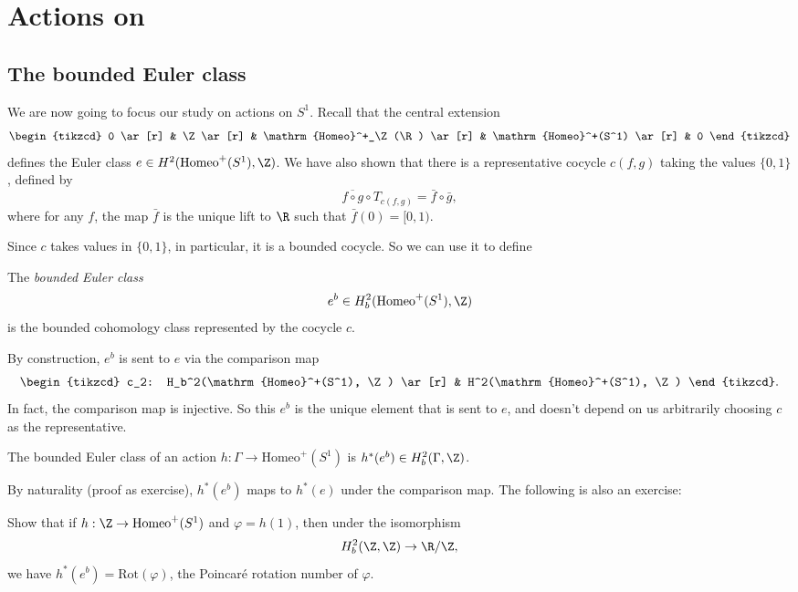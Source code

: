 \documentclass[a4paper]{article}
\newcommand\Homeo{\mathrm{Homeo}}
\newcommand\Rot{\mathrm{Rot}}
\begin{document}
\section{Actions on }
\subsection{The bounded Euler class}
We are now going to focus our study on actions on $S^1$. Recall that the central extension
\[
  \begin{tikzcd}
    0 \ar[r] & \Z \ar[r] & \Homeo^+_\Z(\R) \ar[r] & \Homeo^+(S^1) \ar[r] & 0
  \end{tikzcd}
\]
defines the Euler class $e \in H^2(\Homeo^+(S^1), \Z)$. We have also shown that there is a representative cocycle $c(f, g)$ taking the values $\{0, 1\}$, defined by
\[
  \overline{f \circ g} \circ T_{c(f, g)} = \bar{f} \circ \bar{g},
\]
where for any $f$, the map $\bar{f}$ is the unique lift to $\R$ such that $\bar{f}(0) = [0, 1)$.

Since $c$ takes values in $\{0, 1\}$, in particular, it is a bounded cocycle. So we can use it to define
\begin{defi}
  The \emph{bounded Euler class}
  \[
    e^b \in H_b^2(\Homeo^+(S^1), \Z)
  \]
  is the bounded cohomology class represented by the cocycle $c$.
\end{defi}

By construction, $e^b$ is sent to $e$ via the comparison map
\[
  \begin{tikzcd}
    c_2: H_b^2(\Homeo^+(S^1), \Z) \ar[r] & H^2(\Homeo^+(S^1), \Z)
  \end{tikzcd}.
\]
In fact, the comparison map is injective. So this $e^b$ is the unique element that is sent to $e$, and doesn't depend on us arbitrarily choosing $c$ as the representative.

\begin{defi}
  The bounded Euler class of an action $h: \Gamma \to \Homeo^+(S^1)$ is $h^*(e^b) \in H_b^2(\Gamma, \Z)$.
\end{defi}

By naturality (proof as exercise), $h^*(e^b)$ maps to $h^*(e)$ under the comparison map. The following is also an exercise:

\begin{ex}
  Show that if $h: \Z \to \Homeo^+(S^1)$ and $\varphi = h(1)$, then under the isomorphism
  \[
    H^2_b(\Z, \Z) \to \R/\Z,
  \]
  we have $h^*(e^b) = \Rot(\varphi)$, the Poincar\'e rotation number of $\varphi$.
\end{ex} %
\end{document}
